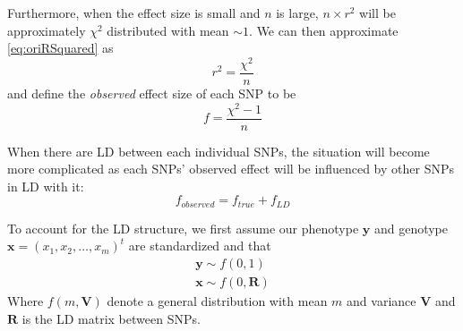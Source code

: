 \documentclass[12pt]{scrbook}
\begin{document}
Furthermore, when the effect size is small and $n$ is large, $n\times r^2$ will be approximately $\chi^2$ distributed with mean $\sim 1$. 
We can then approximate \cref{eq:oriRSquared} as
\begin{equation}
r^2= \frac{\chi^2}{n}
\label{eq:approxChi}
\end{equation}
and define the \emph{observed} effect size of each \gls{SNP} to be
\begin{equation}
f=\frac{\chi^2-1}{n}
\label{eq:observedEffect}
\end{equation}

When there are \gls{LD} between each individual \glspl{SNP}, the situation will become more complicated as each \glspl{SNP}' observed effect will be influenced by other \glspl{SNP} in \gls{LD} with it:
\begin{equation}
f_{observed} = f_{true}+f_{LD}
\label{eq:conceptF}
\end{equation}

To account for the \gls{LD} structure, we first assume our phenotype $\boldsymbol{y}$ and genotype $\boldsymbol{x}=(x_1,x_2,\dots,x_m)^t$ are standardized and that
\begin{align*}
\boldsymbol{y}\sim f(0,1) \\
\boldsymbol{x}\sim f(0,\boldsymbol{R})
\end{align*}
Where $f(m, \boldsymbol{V})$ denote a general distribution with mean $m$ and variance $\boldsymbol{V}$ and $\boldsymbol{R}$ is the \gls{LD} matrix between \glspl{SNP}.
\end{document}
